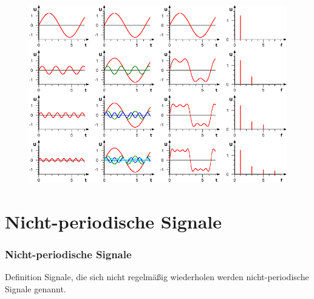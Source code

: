 \begin{frame}
  \begin{center}
    \begin{figure}
      \includegraphics[width=\textwidth,height=.8\textheight,keepaspectratio]{a11/748px-Fourier_synthesis.png}
    \end{figure}
  \end{center}
\end{frame}

\section{Nicht-periodische Signale}

\begin{frame}
  \frametitle{Nicht-periodische Signale}

  \begin{block}{Definition}
    Signale, die sich nicht regelmäßig wiederholen werden nicht-periodische Signale genannt.
  \end{block}

\end{frame}

